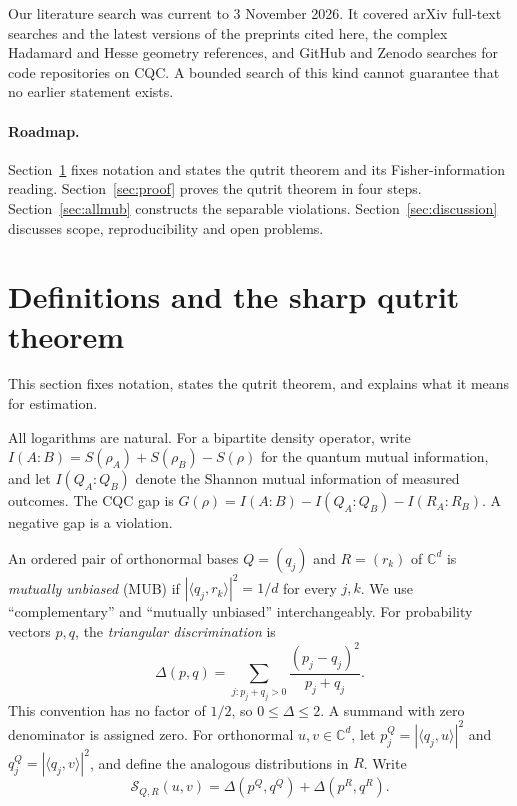 \documentclass[11pt,a4paper]{article}
\numberwithin{equation}{section}
\theoremstyle{remark}\newtheorem{remark}[theorem]{Remark}
\newcommand{\C}{\mathbb C}\newcommand{\R}{\mathbb R}
\begin{document}
Our literature search was current to 3 November 2026. It covered arXiv full-text searches and the latest versions of the preprints cited here, the complex Hadamard and Hesse geometry references, and GitHub and Zenodo searches for code repositories on CQC. A bounded search of this kind cannot guarantee that no earlier statement exists.

\paragraph{Roadmap.}
Section~\ref{sec:defs} fixes notation and states the qutrit theorem and its Fisher-information reading. Section~\ref{sec:proof} proves the qutrit theorem in four steps. Section~\ref{sec:allmub} constructs the separable violations. Section~\ref{sec:discussion} discusses scope, reproducibility and open problems.

\section{Definitions and the sharp qutrit theorem}\label{sec:defs}
This section fixes notation, states the qutrit theorem, and explains what it means for estimation.

All logarithms are natural. For a bipartite density operator, write $I(A:B)=S(\rho_A)+S(\rho_B)-S(\rho)$ for the quantum mutual information, and let $I(Q_A:Q_B)$ denote the Shannon mutual information of measured outcomes. The CQC gap is $G(\rho)=I(A:B)-I(Q_A:Q_B)-I(R_A:R_B)$. A negative gap is a violation.

An ordered pair of orthonormal bases $Q=(q_j)$ and $R=(r_k)$ of $\C^d$ is \emph{mutually unbiased} (MUB) if $|\langle q_j,r_k\rangle|^2=1/d$ for every $j,k$. We use ``complementary'' and ``mutually unbiased'' interchangeably. For probability vectors $p,q$, the \emph{triangular discrimination} is
\begin{equation}
\Delta(p,q)=\sum_{j:p_j+q_j>0}\frac{(p_j-q_j)^2}{p_j+q_j}.
\label{eq:delta}
\end{equation}
This convention has no factor of $1/2$, so $0\le\Delta\le2$. A summand with zero denominator is assigned zero. For orthonormal $u,v\in\C^d$, let $p^Q_j=|\langle q_j,u\rangle|^2$ and $q^Q_j=|\langle q_j,v\rangle|^2$, and define the analogous distributions in $R$. Write
\begin{equation}
\mathcal S_{Q,R}(u,v)=\Delta(p^Q,q^Q)+\Delta(p^R,q^R).
\end{equation}
\end{document}
